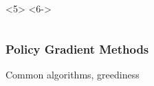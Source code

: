 \documentclass[aspectratio=169, table]{beamer}
\begin{document}
\begin{frame}
\begin{columns}
\begin{column}{.35\textwidth}
\begin{overlayarea}{\textwidth}{\textheight}
	<6->
\end{overlayarea}
\end{column}
\end{columns}
\end{frame}

\begin{frame}
\frametitle{Policy Gradient Methods}
Common algorithms, greediness
\end{frame}
\end{document}
